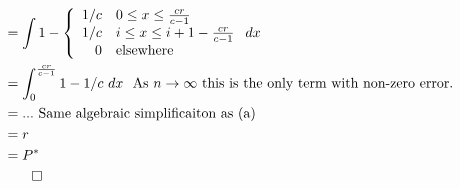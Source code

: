 \documentclass[12pt]{article}
\begin{document}
\begin{enumerate}
\begin{enumerate}
\begin{equation}
\begin{split}
   &= \int 1- \left\{ \begin{array}{rl} 1/c & 0\leq x \leq \frac{cr}{c-1} \\ 1/c & i \leq x \leq i+1-\frac{cr}{c-1} \\ 0 & \text{elsewhere} \end{array} \right. dx \\
   &= \int_0^\frac{cr}{c-1}1-1/c~dx~~\text{As $n \to \infty$ this is the only term with non-zero error.} \\
   &= ...~\text{Same algebraic simplificaiton as (a)} \\
   &=r \\
   &=P^* \\
   & \qed
\end{split}
\end{equation}
\end{enumerate}
\end{enumerate}
\end{document}
